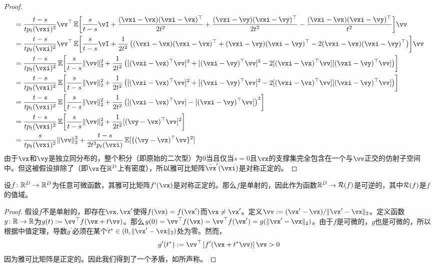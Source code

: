 \documentclass[../../book-main.tex]{subfiles}
\begin{document}
\begin{proof}
\begin{align}
        &= \frac{t - s}{tp_{t}(\vxi)^{2}}\vv^{\top}\Ex\rs{\frac{s}{t - s}\vI +\frac{(\vxi - \vx)(\vxi - \vx)^{\top}}{2t^{2}} + \frac{(\vxi - \vy)(\vxi - \vy)^{\top}}{2t^{2}} - \frac{(\vxi - \vx)(\vxi - \vy)^{\top}}{t^{2}}}\vv \\
        &= \frac{t - s}{tp_{t}(\vxi)^{2}}\vv^{\top}\Ex\rs{\frac{s}{t - s}\vI +\frac{1}{2t^{2}}\bp{(\vxi - \vx)(\vxi - \vx)^{\top} + (\vxi - \vy)(\vxi - \vy)^{\top} - 2(\vxi - \vx)(\vxi - \vy)^{\top}}}\vv \\
        &= \frac{t - s}{tp_{t}(\vxi)^{2}}\Ex\rs{\frac{s}{t - s}\norm{\vv}_{2}^{2} +\frac{1}{2t^{2}}\bp{[(\vxi - \vx)^{\top}\vv]^{2} + [(\vxi - \vy)^{\top}\vv]^{2} - 2[(\vxi - \vx)^{\top}\vv][(\vxi - \vy)^{\top}\vv]}} \\
        &= \frac{t - s}{tp_{t}(\vxi)^{2}}\Ex\rs{\frac{s}{t - s}\norm{\vv}_{2}^{2} +\frac{1}{2t^{2}}\bp{[(\vxi - \vx)^{\top}\vv]^{2} + [(\vxi - \vy)^{\top}\vv]^{2} - 2[(\vxi - \vx)^{\top}\vv][(\vxi - \vy)^{\top}\vv]}} \\
        &= \frac{t - s}{tp_{t}(\vxi)^{2}}\Ex\rs{\frac{s}{t - s}\norm{\vv}_{2}^{2} +\frac{1}{2t^{2}}\bp{[(\vxi - \vx)^{\top}\vv] - [(\vxi - \vy)^{\top}\vv]}^{2}} \\
        &= \frac{t - s}{tp_{t}(\vxi)^{2}}\Ex\rs{\frac{s}{t - s}\norm{\vv}_{2}^{2} +\frac{1}{2t^{2}}[(\vy - \vx)^{\top}\vv]^{2}} \\
        &= \frac{s}{tp_{t}(\vxi)^{2}}\norm{\vv}_{2}^{2} + \frac{t - s}{2t^{3}p_{t}(\vxi)}\Ex[\{(\vy - \vx)^{\top}\vv\}^{2}]
    \end{align}
    由于\(\vx\)和\(\vy\)是独立同分布的，整个积分（即原始的二次型）为\(0\)当且仅当\(s = 0\)且\(\vx\)的支撑集完全包含在一个与\(\vv\)正交的仿射子空间中。但这被假设排除了（即\(\vx\)在\(\mathbb{R}^{D}\)上有密度），所以雅可比矩阵\(\bar{\vx}^{\prime}(\vxi)\)是对称正定的。
\end{proof}

\begin{lemma}\label{lem:gribonval_A2}
    设\(f \colon \mathbb{R}^{D} \to \mathbb{R}^{D}\)为任意可微函数，其雅可比矩阵\(f^{\prime}(\vx)\)是对称正定的。那么\(f\)是单射的，因此作为函数\(\mathbb{R}^{D} \to \mathcal{R}(f)\)是可逆的，其中\(\mathcal{R}(f)\)是\(f\)的值域。
\end{lemma}
\begin{proof}
    假设\(f\)不是单射的，即存在\(\vx, \vx^{\prime}\)使得\(f(\vx) = f(\vx^{\prime})\)而\(\vx \neq \vx^{\prime}\)。定义\(\vv := (\vx^{\prime} - \vx)/\norm{\vx^{\prime} - \vx}_{2}\)。定义函数\(g \colon \mathbb{R} \to \mathbb{R}\)为\(g(t) := \vv^{\top}f(\vx + t\vv)\)。那么\(g(0) = \vv^{\top}f(\vx) = \vv^{\top}f(\vx^{\prime}) = g(\norm{\vx^{\prime} - \vx}_{2})\)。由于\(f\)是可微的，\(g\)也是可微的，所以根据中值定理，导数\(g^{\prime}\)必须在某个\(t^{\ast} \in (0, \norm{\vx^{\prime} - \vx}_{2})\)处为零。然而，
    \begin{equation}
        g^{\prime}(t^{\ast}) := \vv^{\top}\bs{f^{\prime}(\vx + t^{\ast}\vv)}\vv > 0
    \end{equation}
    因为雅可比矩阵是正定的。因此我们得到了一个矛盾，如所声称。
\end{proof}
\end{document}
